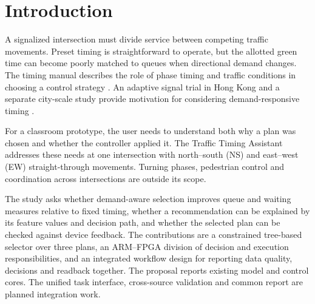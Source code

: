\section{Introduction}
A signalized intersection must divide service between competing traffic movements. Preset timing is straightforward to operate, but the allotted green time can become poorly matched to queues when directional demand changes. The timing manual describes the role of phase timing and traffic conditions in choosing a control strategy \cite{koonce}. An adaptive signal trial in Hong Kong and a separate city-scale study provide motivation for considering demand-responsive timing \cite{hk,wu}.

For a classroom prototype, the user needs to understand both why a plan was chosen and whether the controller applied it. The Traffic Timing Assistant addresses these needs at one intersection with north--south (NS) and east--west (EW) straight-through movements. Turning phases, pedestrian control and coordination across intersections are outside its scope.

The study asks whether demand-aware selection improves queue and waiting measures relative to fixed timing, whether a recommendation can be explained by its feature values and decision path, and whether the selected plan can be checked against device feedback. The contributions are a constrained tree-based selector over three plans, an ARM--FPGA division of decision and execution responsibilities, and an integrated workflow design for reporting data quality, decisions and readback together. The proposal reports existing model and control cores. The unified task interface, cross-source validation and common report are planned integration work.
